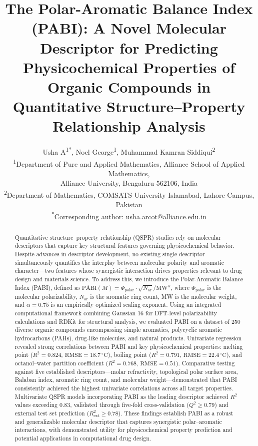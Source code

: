 \documentclass[12pt,a4paper]{article}
\title{The Polar-Aromatic Balance Index (PABI): A Novel Molecular Descriptor for Predicting Physicochemical Properties of Organic Compounds in Quantitative Structure--Property Relationship Analysis}
\author{
Usha A\textsuperscript{1*},
Noel George\textsuperscript{1},
Muhammad Kamran Siddiqui\textsuperscript{2}\\
\small
\textsuperscript{1}Department of Pure and Applied Mathematics, Alliance School of Applied Mathematics,\\
\small Alliance University, Bengaluru 562106, India\\
\small
\textsuperscript{2}Department of Mathematics, COMSATS University Islamabad, Lahore Campus, Pakistan\\
\small
\textsuperscript{*}Corresponding author: usha.arcot@alliance.edu.in
}
\date{}
\begin{document}
\maketitle

\begin{abstract}
Quantitative structure--property relationship (QSPR) studies rely on molecular descriptors that capture key structural features governing physicochemical behavior. Despite advances in descriptor development, no existing single descriptor simultaneously quantifies the interplay between molecular polarity and aromatic character---two features whose synergistic interaction drives properties relevant to drug design and materials science. To address this, we introduce the Polar-Aromatic Balance Index (PABI), defined as $\text{PABI}(M) = \Phi_{\text{polar}} \cdot \sqrt{N_{\text{ar}}} / \text{MW}^{\alpha}$, where $\Phi_{\text{polar}}$ is the molecular polarizability, $N_{\text{ar}}$ is the aromatic ring count, MW is the molecular weight, and $\alpha = 0.75$ is an empirically optimized scaling exponent. Using an integrated computational framework combining Gaussian 16 for DFT-level polarizability calculations and RDKit for structural analysis, we evaluated PABI on a dataset of 250 diverse organic compounds encompassing simple aromatics, polycyclic aromatic hydrocarbons (PAHs), drug-like molecules, and natural products. Univariate regression revealed strong correlations between PABI and key physicochemical properties: melting point ($R^2 = 0.824$, $\text{RMSE} = 18.7\,^{\circ}\text{C}$), boiling point ($R^2 = 0.791$, $\text{RMSE} = 22.4\,^{\circ}\text{C}$), and octanol--water partition coefficient ($R^2 = 0.768$, $\text{RMSE} = 0.51$). Comparative testing against five established descriptors---molar refractivity, topological polar surface area, Balaban index, aromatic ring count, and molecular weight---demonstrated that PABI consistently achieved the highest univariate correlations across all target properties. Multivariate QSPR models incorporating PABI as the leading descriptor achieved $R^2$ values exceeding 0.83, validated through five-fold cross-validation ($Q^2 \geq 0.79$) and external test set prediction ($R^2_{\text{ext}} \geq 0.78$). These findings establish PABI as a robust and generalizable molecular descriptor that captures synergistic polar--aromatic interactions, with demonstrated utility for physicochemical property prediction and potential applications in computational drug design.
\end{abstract}
\end{document}
